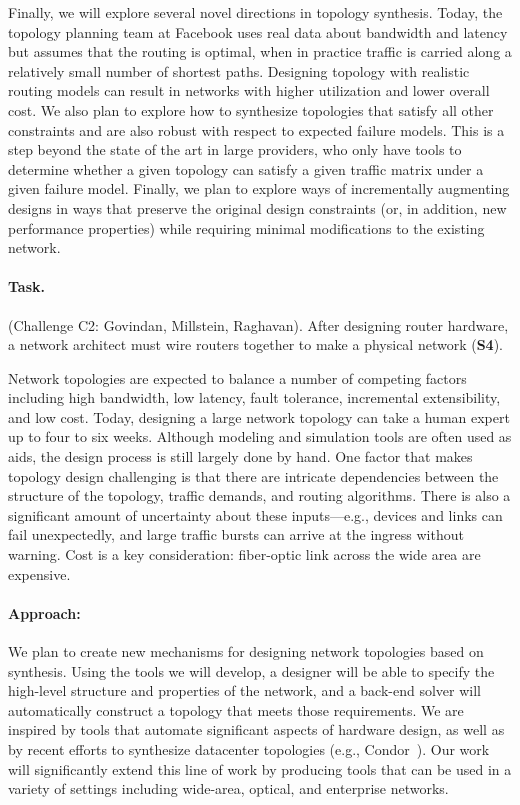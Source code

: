 \iffalse
Finally, we will explore several novel directions in topology
synthesis. Today, the topology planning team at Facebook uses real
data about bandwidth and latency but assumes that the routing is
optimal, when in practice traffic is carried along a relatively small
number of shortest paths. Designing topology with realistic routing
models can result in networks with higher utilization and lower
overall cost.  We also plan to explore how to synthesize topologies
that satisfy all other constraints and are also robust with respect to
expected failure models. This is a step beyond the state of the art in
large providers, who only have tools to determine whether a given
topology can satisfy a given traffic matrix under a given failure
model. Finally, we plan to
explore ways of incrementally augmenting designs in ways that preserve
the original design constraints (or, in addition, new performance
properties) while requiring minimal modifications to the existing
network.


\paragraph*{Task.} (Challenge C2: Govindan, Millstein, Raghavan). After designing
router hardware, a network architect must wire routers together to
make a physical network ({\bf S4}).
%

Network topologies are expected to balance a number of competing
factors including high bandwidth, low latency, fault tolerance,
incremental extensibility, and low cost. Today, designing a large
network topology can take a human expert up to four to six
weeks. Although modeling and simulation tools are often used as aids,
the design process is still largely done by hand. One factor that
makes topology design challenging is that there are intricate
dependencies between the structure of the topology, traffic demands,
and routing algorithms. There is also a significant amount of
uncertainty about these inputs---e.g., devices and links can fail
unexpectedly, and large traffic bursts can arrive at the ingress
without warning. Cost is a key consideration: fiber-optic link across
the wide area are expensive.

\paragraph*{Approach:}
%
We plan to create new mechanisms for designing network topologies
based on synthesis. Using the tools we will develop, a designer will
be able to specify the high-level structure and properties of the
network, and a back-end solver will automatically construct a topology
that meets those requirements. We are inspired by tools that automate
significant aspects of hardware design, as well as by recent efforts
to synthesize datacenter topologies (e.g., Condor~\cite{condor}). Our
work will significantly extend this line of work by producing tools
that can be used in a variety of settings including wide-area,
optical, and enterprise networks.

